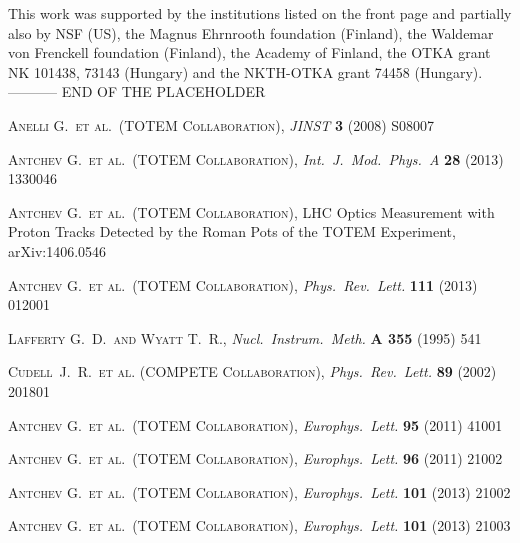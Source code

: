 \documentclass[TOTEM]{cern/cernphprep}
\def\etal{et al.}
\def\Name#1{\textsc{#1}, }
\def\REVIEW#1#2#3#4{{\it #1} {\bf #2} (#3) #4}
\begin{document}
This work was supported by the institutions listed on the front page and partially also by NSF (US), the Magnus
Ehrnrooth foundation (Finland), the Waldemar von Frenckell foundation (Finland), the Academy of
Finland, the OTKA grant NK 101438, 73143 (Hungary) and the NKTH-OTKA grant 74458 (Hungary).
----------- END OF THE PLACEHOLDER


\begin{thebibliography}{99}

	\Name{Anelli G.~\etal{}~(TOTEM Collaboration)}
	\REVIEW{JINST}{3}{2008}{S08007}

	\Name{Antchev G.~\etal{}~(TOTEM Collaboration)}
	\REVIEW{Int.~J.~Mod.~Phys.~A}{28}{2013}{1330046}

	\Name{Antchev G.~\etal{}~(TOTEM Collaboration)}
	LHC Optics Measurement with Proton Tracks Detected by the Roman Pots of the TOTEM Experiment, 
	arXiv:1406.0546

	\Name{Antchev G.~\etal{}~(TOTEM Collaboration)}
	\REVIEW{Phys.~Rev.~Lett.}{111}{2013}{012001}

	\Name{Lafferty G.~D.~and Wyatt T.~R.}
	\REVIEW{Nucl.\ Instrum.\ Meth.}{A 355}{1995}{541}

	\Name{Cudell~J.~R.~\etal{} (COMPETE Collaboration)}
	\REVIEW{Phys.\ Rev.\ Lett.}{89}{2002}{201801}


\iffalse

	\Name{Antchev G.~\etal{}~(TOTEM Collaboration)}
	\REVIEW{Europhys.~Lett.}{95}{2011}{41001}

	\Name{Antchev G.~\etal{}~(TOTEM Collaboration)}
	\REVIEW{Europhys.~Lett.}{96}{2011}{21002}

	\Name{Antchev G.~\etal{}~(TOTEM Collaboration)}
	\REVIEW{Europhys.~Lett.}{101}{2013}{21002}

	\Name{Antchev G.~\etal{}~(TOTEM Collaboration)}
	\REVIEW{Europhys.~Lett.}{101}{2013}{21003}


\end{thebibliography}
\end{document}
